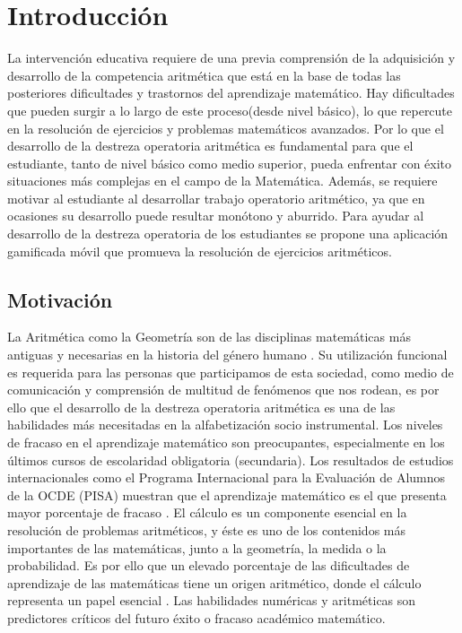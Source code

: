\documentclass{article}
\begin{document}
\section{Introducción}
La intervención educativa requiere de una previa comprensión de la adquisición y desarrollo de 
la competencia aritmética que está en la base de todas las posteriores dificultades y 
trastornos del aprendizaje matemático. Hay dificultades que pueden surgir a lo largo de 
este proceso(desde nivel básico), lo que repercute en la resolución de ejercicios y 
problemas matemáticos avanzados. Por lo que el desarrollo de la destreza operatoria aritmética 
es fundamental para que el estudiante, tanto de nivel básico como medio superior, pueda 
enfrentar con éxito situaciones más complejas en el campo de la Matemática. Además, se 
requiere motivar al estudiante al desarrollar trabajo operatorio aritmético, ya que en 
ocasiones su desarrollo puede resultar monótono y aburrido. Para ayudar al desarrollo de 
la destreza operatoria de los estudiantes se propone una aplicación gamificada móvil que 
promueva la resolución de ejercicios aritméticos.

\subsection{Motivación}
La Aritmética como la Geometría son de las disciplinas matemáticas más antiguas y necesarias
 en la historia del género humano \cite{coronado2014estudio}. 
Su utilización funcional es requerida para las personas que participamos de esta sociedad, 
como medio de comunicación y comprensión de multitud de fenómenos que nos rodean, es por ello 
que el desarrollo de la destreza operatoria aritmética es una de las habilidades más 
necesitadas en la alfabetización socio instrumental. Los niveles de fracaso en el aprendizaje matemático son preocupantes, especialmente en los 
últimos cursos de escolaridad obligatoria (secundaria). Los resultados de estudios internacionales 
como el Programa Internacional para la Evaluación de Alumnos de la OCDE 
(PISA)\cite{oecd2014what,oecd2016low} muestran que el aprendizaje matemático es el que 
presenta mayor porcentaje de fracaso \cite{coronado2016academic, mullis2016timss}. El cálculo 
es un componente esencial en la resolución de problemas aritméticos, y éste es uno de los 
contenidos más importantes de las matemáticas, junto a la geometría, la medida o la probabilidad. 
Es por ello que un elevado porcentaje de las dificultades de aprendizaje de las matemáticas 
tiene un origen aritmético, donde el cálculo representa un papel 
esencial \cite{orrantia2006dificultades}. Las habilidades numéricas y aritméticas son predictores 
críticos del futuro éxito o fracaso académico matemático\cite{rodriguez2017marcadores}. 
\end{document}
